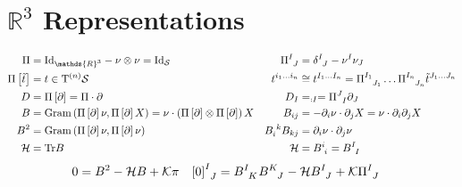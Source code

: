 \documentclass[a4paper,10pt]{scrartcl}
\newcommand{\surf}{\mathcal{S}}
\newcommand{\T}{\mathrm{T}}
\newcommand{\R}{\mathds{R}}
\newcommand{\tps}[1]{\T^{(#1)}\surf}
\newcommand{\tns}{\tps{n}}
\newcommand{\gauss}{\mathcal{K}}
\newcommand{\mean}{\mathcal{H}}
\newcommand{\Tr}{\mathrm{Tr}}
\newcommand{\pism}{\Pi}
\newcommand{\pis}[1]{\pism\left[ #1 \right]}
\newcommand{\pissf}[2]{\tensor{\pism}{^{#1}_{#2}}}
\newcommand{\bsf}[2]{\tensor{B}{^{#1}_{#2}}}
\begin{document}
\section{\( \R^{3} \) Representations}

\begin{align*}
  \pism &= \textup{Id}_{\R^{3}} - \nu\otimes\nu = \textup{Id}_{\surf}
        &\pissf{I}{J} &= \tensor{\delta}{^{I}_{J}} - \nu^{I}\nu_{J} \\
  \pis{\tilde{t}} &= t \in\tns
        & t^{i_{1}\ldots i_{n}} &\cong t^{I_{1}\ldots I_{n}} = \pissf{I_{1}}{J_{1}}\ldots\pissf{I_{n}}{J_{n}}\tilde{t}^{J_{1}\ldots J_{n}} \\
  D &= \pis{\partial} = \pism\cdot\partial
        &D_{I} &= _{:I} = \pissf{J}{I}\partial_{J}\\
  B &= \textup{Gram}\left( \pis{\partial}\nu , \pis{\partial}X \right) = \nu \cdot \left(\pis{\partial} \otimes \pis{\partial}\right) X
        &B_{ij} &= -\partial_{i}\nu \cdot \partial_{j}X = \nu \cdot \partial_{i}\partial_{j}X\\
  B^{2} &= \textup{Gram}\left( \pis{\partial}\nu , \pis{\partial}\nu \right)
        &\tensor{B}{_{i}^{k}}B_{kj} &= \partial_{i}\nu \cdot \partial_{j}\nu\\
  \mean &= \Tr B
        &\mean &= \bsf{i}{i} = \bsf{I}{I}
\end{align*}
\begin{align*}
  0 &= B^{2} - \mean B + \gauss\pi
        &\tensor{\left[ 0 \right]}{^{I}_{J}} &= \bsf{I}{K}\bsf{K}{J} - \mean\bsf{I}{J} + \gauss\pissf{I}{J}
\end{align*}
\end{document}
